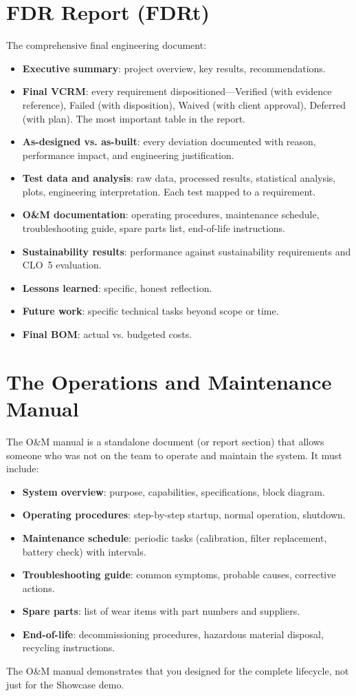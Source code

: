 \section{FDR Report (FDRt)}
The comprehensive final engineering document:
\begin{itemize}[nosep,leftmargin=1.5em]
\item \textbf{Executive summary}: project overview, key results, recommendations.
\item \textbf{Final VCRM}: every requirement dispositioned---Verified (with evidence reference), Failed (with disposition), Waived (with client approval), Deferred (with plan). The most important table in the report.
\item \textbf{As-designed vs. as-built}: every deviation documented with reason, performance impact, and engineering justification.
\item \textbf{Test data and analysis}: raw data, processed results, statistical analysis, plots, engineering interpretation. Each test mapped to a requirement.
\item \textbf{O\&M documentation}: operating procedures, maintenance schedule, troubleshooting guide, spare parts list, end-of-life instructions.
\item \textbf{Sustainability results}: performance against sustainability requirements and CLO~5 evaluation.
\item \textbf{Lessons learned}: specific, honest reflection.
\item \textbf{Future work}: specific technical tasks beyond scope or time.
\item \textbf{Final BOM}: actual vs. budgeted costs.
\end{itemize}

\section{The Operations and Maintenance Manual}
The O\&M manual is a standalone document (or report section) that allows someone who was not on the team to operate and maintain the system. It must include:
\begin{itemize}[nosep,leftmargin=1.5em]
\item \textbf{System overview}: purpose, capabilities, specifications, block diagram.
\item \textbf{Operating procedures}: step-by-step startup, normal operation, shutdown.
\item \textbf{Maintenance schedule}: periodic tasks (calibration, filter replacement, battery check) with intervals.
\item \textbf{Troubleshooting guide}: common symptoms, probable causes, corrective actions.
\item \textbf{Spare parts}: list of wear items with part numbers and suppliers.
\item \textbf{End-of-life}: decommissioning procedures, hazardous material disposal, recycling instructions.
\end{itemize}
The O\&M manual demonstrates that you designed for the complete lifecycle, not just for the Showcase demo.

